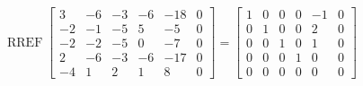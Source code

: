 \begin{exerciseAnswer} 


\[\operatorname{RREF} \left[\begin{array}{ccccc|c}
3 & -6 & -3 & -6 & -18 & 0 \\
-2 & -1 & -5 & 5 & -5 & 0 \\
-2 & -2 & -5 & 0 & -7 & 0 \\
2 & -6 & -3 & -6 & -17 & 0 \\
-4 & 1 & 2 & 1 & 8 & 0
\end{array}\right] = \left[\begin{array}{ccccc|c}
1 & 0 & 0 & 0 & -1 & 0 \\
0 & 1 & 0 & 0 & 2 & 0 \\
0 & 0 & 1 & 0 & 1 & 0 \\
0 & 0 & 0 & 1 & 0 & 0 \\
0 & 0 & 0 & 0 & 0 & 0
\end{array}\right] \]



\end{exerciseAnswer}
